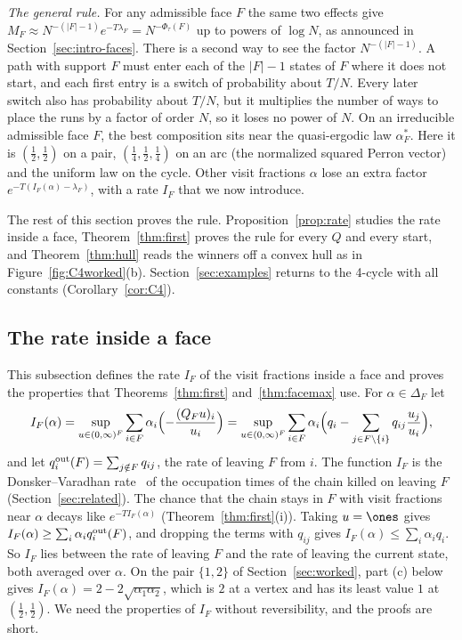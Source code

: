 \emph{The general rule.} For any admissible face $F$ the same two effects give
$M_F\approx N^{-(\lvert F\rvert-1)}e^{-T\lambda_F}=N^{-\Phi_\tau(F)}$ up to
powers of $\log N$, as announced in Section~\ref{sec:intro-faces}. There is a
second way to see the factor $N^{-(\lvert F\rvert-1)}$. A path with support $F$
must enter each of the $\lvert F\rvert-1$ states of $F$ where it does not
start, and each first entry is a switch of probability about $T/N$. Every later
switch also has probability about $T/N$, but it multiplies the number of ways
to place the runs by a factor of order $N$, so it loses no power of $N$. On an
irreducible admissible face $F$, the best composition sits near the quasi-ergodic law
$\alpha^*_F$. Here it
is $(\frac12,\frac12)$ on a pair, $(\frac14,\frac12,\frac14)$ on an arc (the
normalized squared Perron vector) and the uniform law on the cycle. Other
visit fractions $\alpha$ lose an extra factor
$e^{-T(I_F(\alpha)-\lambda_F)}$, with a rate $I_F$ that we now introduce.

The rest of this section proves the rule. Proposition~\ref{prop:rate} studies
the rate inside a face, Theorem~\ref{thm:first} proves the rule for every $Q$
and every start, and Theorem~\ref{thm:hull} reads the winners off a convex hull
as in Figure~\ref{fig:C4worked}(b). Section~\ref{sec:examples} returns to the
4-cycle with all constants (Corollary~\ref{cor:C4}).

\subsection{The rate inside a face}

This subsection defines the rate $I_F$ of the visit fractions inside a face and proves the
properties that Theorems~\ref{thm:first} and~\ref{thm:facemax} use. For $\alpha\in\Delta_F$ let
\[
 I_F(\alpha)=\sup_{u\in(0,\infty)^F}\sum_{i\in F}\alpha_i\Bigl(-\frac{(Q_Fu)_i}{u_i}\Bigr)
 =\sup_{u\in(0,\infty)^F}\sum_{i\in F}\alpha_i\Bigl(q_i-\sum_{j\in F\setminus\{i\}}q_{ij}\frac{u_j}{u_i}\Bigr),
\]
and let $q_i^{\rm out}(F)=\sum_{j\notin F}q_{ij}$, the rate of leaving $F$ from
$i$. The function $I_F$ is the Donsker--Varadhan rate~\cite{dv1975} of the
occupation times of the chain killed on leaving $F$
(Section~\ref{sec:related}). The chance that the chain stays in $F$ with visit
fractions near $\alpha$ decays like $e^{-TI_F(\alpha)}$
(Theorem~\ref{thm:first}(i)). Taking $u=\ones$ gives
$I_F(\alpha)\ge\sum_i\alpha_iq_i^{\rm out}(F)$, and dropping the terms with
$q_{ij}$ gives $I_F(\alpha)\le\sum_i\alpha_iq_i$. So $I_F$ lies between the
rate of leaving $F$ and the rate of leaving the current state, both averaged
over $\alpha$. On the pair $\{1,2\}$ of Section~\ref{sec:worked}, part (c)
below gives $I_F(\alpha)=2-2\sqrt{\alpha_1\alpha_2}$, which is $2$ at a vertex
and has its least value $1$ at $(\frac12,\frac12)$. We need the properties of
$I_F$ without reversibility, and the proofs are short.

